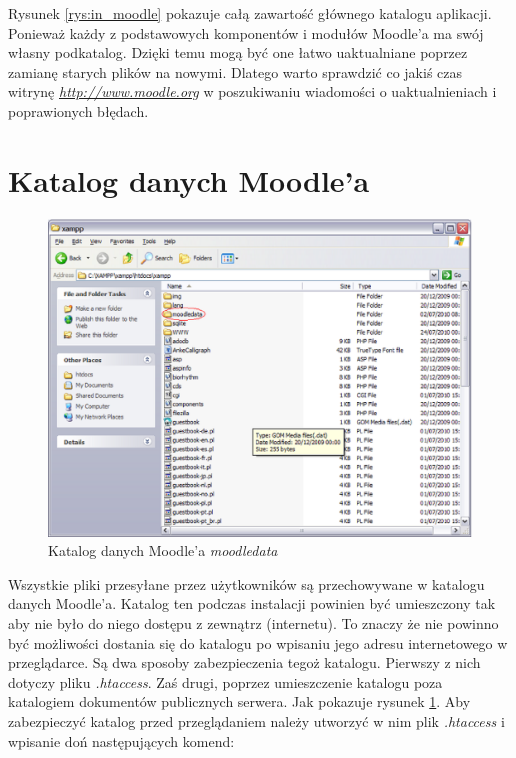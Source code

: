 Rysunek \ref{rys:in_moodle} pokazuje całą zawartość głównego katalogu aplikacji. \\
Ponieważ każdy z podstawowych komponentów i modułów Moodle'a ma swój własny podkatalog. Dzięki temu mogą być one łatwo uaktualniane poprzez zamianę starych plików na nowymi. Dlatego warto sprawdzić co jakiś czas witrynę \href{http://www.moodle.org}{\textit{http://www.moodle.org}} w poszukiwaniu wiadomości o uaktualnieniach i poprawionych błędach. \\
\section{Katalog danych Moodle'a} \label{roz:moodledata}
\begin{figure}[!ht]
	\centering
		\caption{Katalog danych Moodle'a \textit{moodledata}} \label{rys:moodledata}
		\includegraphics[width=1\textwidth]{char_narzarzedzi//rys//moodledata.eps}
\end{figure}
Wszystkie pliki przesyłane przez użytkowników są przechowywane w katalogu danych Moodle'a. Katalog ten podczas instalacji powinien być umieszczony tak aby nie było do niego dostępu z zewnątrz (internetu). To znaczy że nie powinno być możliwości dostania się do katalogu po wpisaniu jego adresu internetowego w przeglądarce. Są dwa sposoby zabezpieczenia tegoż katalogu. Pierwszy z nich dotyczy pliku \textit{.htaccess}. Zaś drugi, poprzez umieszczenie katalogu poza katalogiem dokumentów publicznych serwera. Jak pokazuje rysunek \ref{rys:moodledata}. Aby zabezpieczyć katalog przed przeglądaniem należy utworzyć w nim plik \textit{.htaccess} i wpisanie doń następujących komend:\\
